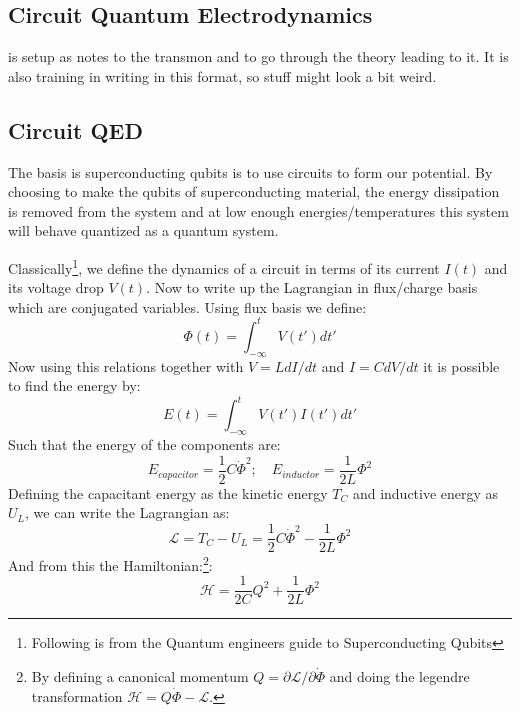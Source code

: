 \begin{fullwidth}
\chapter{Circuit Quantum Electrodynamics}
\end{fullwidth}
 is setup as notes to the transmon and to go through the theory leading to it. It is also training in writing in this format, so stuff might look a bit weird.  \\

\section{Circuit QED}
The basis is superconducting qubits is to use circuits to form our potential. By choosing to make the qubits of superconducting material, the energy dissipation is removed from the system and at low enough energies/temperatures this system will behave quantized as a quantum system. 

Classically\footnote{Following is from the Quantum engineers guide to Superconducting Qubits}, we define the dynamics of a circuit in terms of its current $I(t)$ and its voltage drop $V(t)$. Now to write up the Lagrangian in flux/charge basis which are conjugated variables. Using flux basis we define:
\begin{equation}
    \Phi (t) = \int_{-\infty}^t V(t')dt'
\end{equation}
Now using this relations together with $V = L dI/dt$ and $I = C dV/dt$ it is possible to find the energy by:
\begin{equation}\label{eq: Energy from current and voltage}
    E(t) = \int_{-\infty}^t V(t')I(t')dt'
\end{equation}
Such that the energy of the components are:
\begin{equation}
    E_{capacitor} = \frac12 C \dot{\Phi}^2; \quad E_{inductor} = \frac{1}{2L} \Phi^2
\end{equation}
Defining the capacitant energy as the kinetic energy $T_C$ and inductive energy as $U_L$, we can write the Lagrangian as:
\begin{equation}
    \mathcal{L} = T_C - U_L = \frac12 C \dot{\Phi}^2 - \frac{1}{2L} \Phi^2
\end{equation}
And from this the Hamiltonian:\footnote{By defining a canonical momentum $Q = \partial \mathcal{L} / \partial \dot{\Phi}$ and doing the legendre transformation $\mathcal{H} = Q\dot{\Phi} - \mathcal{L}$.}:
\begin{equation}
    \mathcal{H} = \frac{1}{2C} Q^2 + \frac{1}{2L} \Phi^2
\end{equation}

